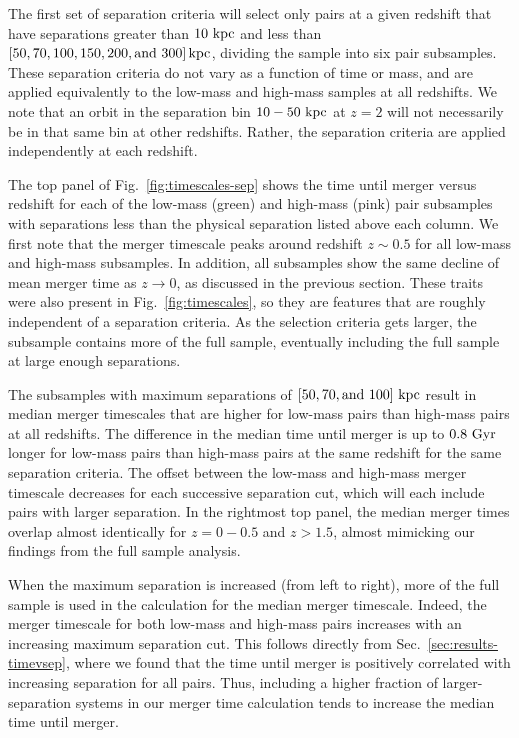 \documentclass[twocolumn,linenumbers]{aastex631}
\begin{document}
        The first set of separation criteria will select only pairs at a given redshift that have separations greater than $10\,\mathrm{\,kpc}$ and less than $[50, 70, 100, 150, 200, \mbox{and }300]\mathrm{\,kpc}$, dividing the sample into six pair subsamples. 
        These separation criteria do not vary as a function of time or mass, and are applied equivalently to the low-mass and high-mass samples at all redshifts. 
        We note that an orbit in the separation bin $10-50\,\mathrm{\,kpc}$ at $z=2$ will not necessarily be in that same bin at other redshifts. 
        Rather, the separation criteria are applied independently at each redshift. 
        
        The top panel of Fig.~\ref{fig:timescales-sep} shows the time until merger versus redshift for each of the low-mass (green) and high-mass (pink) pair subsamples with separations less than the physical separation listed above each column.  
        We first note that the merger timescale peaks around redshift $z\sim0.5$ for all low-mass and high-mass subsamples. 
        In addition, all subsamples show the same decline of mean merger time as $z\to0$, as discussed in the previous section. 
        These traits were also present in Fig.~\ref{fig:timescales}, so they are features that are roughly independent of a separation criteria.
        As the selection criteria gets larger, the subsample contains more of the full sample, eventually including the full sample at large enough separations.
        
        The subsamples with maximum separations of $[50, 70, \mbox{and } 100]\,\mathrm{\,kpc}$ result in median merger timescales that are higher for low-mass pairs than high-mass pairs at all redshifts. 
        The difference in the median time until merger is up to $0.8\,\mathrm{\,Gyr}$ longer for low-mass pairs than high-mass pairs at the same redshift for the same separation criteria. 
        The offset between the low-mass and high-mass merger timescale decreases for each successive separation cut, which will each include pairs with larger separation. 
        In the rightmost top panel, the median merger times overlap almost identically for $z=0-0.5$ and $z>1.5$, almost mimicking our findings from the full sample analysis. 
        
        When the maximum separation is increased (from left to right), more of the full sample is used in the calculation for the median merger timescale. 
        Indeed, the merger timescale for both low-mass and high-mass pairs increases with an increasing maximum separation cut.  
        This follows directly from Sec.~\ref{sec:results-timevsep}, where we found that the time until merger is positively correlated with increasing separation for all pairs. 
        Thus, including a higher fraction of larger-separation systems in our merger time calculation tends to increase the median time until merger. 
        
\end{document}
